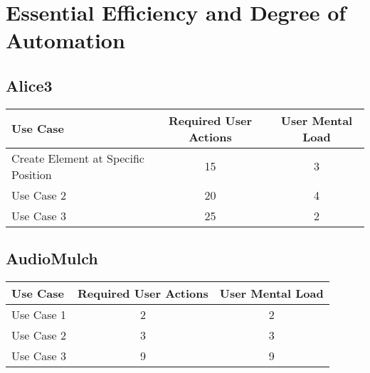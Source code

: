 \section{Essential Efficiency and Degree of Automation}

\subsection{Alice3}


\begin{tabular*}{\textwidth}{lcc}
\textbf{Use Case} & \textbf{Required User Actions} & \textbf{User Mental Load}\\
\hline
Create Element at Specific Position & 15 & 3 \\
Use Case 2                          & 20 & 4 \\
Use Case 3                          & 25 & 2
\end{tabular*}

\subsection{AudioMulch}




\begin{tabular*}{\textwidth}{lcc}
\textbf{Use Case} & \textbf{Required User Actions} & \textbf{User Mental Load}\\
\hline
Use Case 1                          & 2 & 2 \\
Use Case 2                          & 3 & 3 \\
Use Case 3                          & 9 & 9
\end{tabular*}

